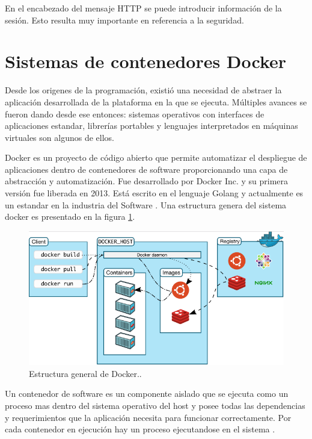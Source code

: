 En el encabezado del mensaje HTTP se puede introducir información de la sesión. Esto resulta muy importante en referencia a la seguridad. 


\section{Sistemas de contenedores Docker}
\label{sec:Docker}

Desde los origenes de la programación, existió una necesidad de abstraer la aplicación desarrollada de la plataforma en la que se ejecuta. Múltiples avances se fueron dando desde ese entonces: sistemas operativos con interfaces de aplicaciones estandar, librerías portables y lenguajes interpretados en máquinas virtuales son algunos de ellos.

Docker es un proyecto de código abierto que permite automatizar el despliegue de aplicaciones dentro de contenedores de software proporcionando una capa de abstracción y automatización. Fue desarrollado por Docker Inc. y su primera versión fue liberada en 2013. Está escrito en el lenguaje Golang y actualmente es un estandar en la industria del Software \citep{WEBSITE:8}. Una estructura genera del sistema docker es presentado en la figura \ref{fig:Contenedores Docker. }.


\pagebreak
\begin{figure}[ht]
	\centering
	\includegraphics[scale=.5]{./Figures/docker.png}
	\caption{Estructura general de Docker.\protect\footnotemark.}
	\label{fig:Contenedores Docker. }

\end{figure}



Un contenedor de software es un componente aislado que se ejecuta como un proceso mas dentro del sistema operativo del host y posee todas las dependencias y requerimientos que la aplicación necesita para funcionar correctamente. Por cada contenedor en ejecución hay un proceso ejecutandose en el sistema \citep{WEBSITE:8}.

